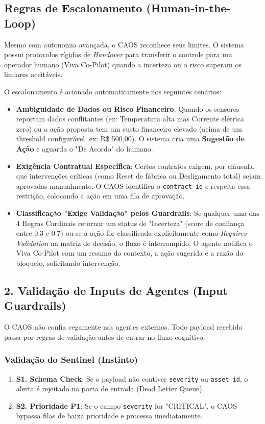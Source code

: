 \documentclass[12pt, a4paper]{article}
\begin{document}
\subsection{Regras de Escalonamento (Human-in-the-Loop)}
\label{sec:escalonamento}

Mesmo com autonomia avançada, o CAOS reconhece seus limites. O sistema possui protocolos rígidos de \textit{Handover} para transferir o controle para um operador humano (Viva Co-Pilot) quando a incerteza ou o risco superam os limiares aceitáveis.

O escalonamento é acionado automaticamente nos seguintes cenários:

\begin{itemize}
    \item \textbf{Ambiguidade de Dados ou Risco Financeiro}:
    Quando os sensores reportam dados conflitantes (ex: Temperatura alta mas Corrente elétrica zero) ou a ação proposta tem um custo financeiro elevado (acima de um threshold configurável, ex: R\$ 500,00). O sistema cria uma \textbf{Sugestão de Ação} e aguarda o "De Acordo" do humano.

    \item \textbf{Exigência Contratual Específica}:
    Certos contratos exigem, por cláusula, que intervenções críticas (como Reset de fábrica ou Desligamento total) sejam aprovadas manualmente. O CAOS identifica o \texttt{contract\_id} e respeita essa restrição, colocando a ação em uma fila de aprovação.

    \item \textbf{Classificação "Exige Validação" pelos Guardrails}:
    Se qualquer uma das 4 Regras Cardinais retornar um status de "Incerteza" (score de confiança entre 0.3 e 0.7) ou se a ação for classificada explicitamente como \textit{Requires Validation} na matriz de decisão, o fluxo é interrompido. O agente notifica o Viva Co-Pilot com um resumo do contexto, a ação sugerida e a razão do bloqueio, solicitando intervenção.
\end{itemize}

\subsection{2. Validação de Inputs de Agentes (Input Guardrails)}
O CAOS não confia cegamente nos agentes externos. Todo payload recebido passa por regras de validação antes de entrar no fluxo cognitivo.

\subsubsection{Validação do Sentinel (Instinto)}
\begin{enumerate}
    \item \textbf{S1. Schema Check}: Se o payload não contiver \texttt{severity} ou \texttt{asset\_id}, o alerta é rejeitado na porta de entrada (Dead Letter Queue).
    \item \textbf{S2. Prioridade P1}: Se o campo \texttt{severity} for "CRITICAL", o CAOS bypassa filas de baixa prioridade e processa imediatamente.
\end{enumerate}
\end{document}
